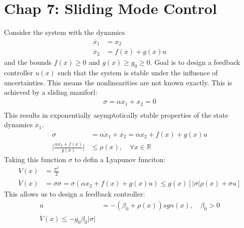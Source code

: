 \section{Chap 7: Sliding Mode Control}
Consider the system with the dynamics
\begin{align*}
    \Dot{x_1} & = x_2          \\
    \Dot{x_2} & = f(x) + g(x)u
\end{align*}
and the bounds $f(x) \geq 0$ and $g(x)\geq g_0 \geq 0$. Goal is to design a feedback controller $u(x)$ such that the system is stable under the influence of uncertainties. This means the nonlinearities are not known exactly. This is achieved by a sliding maniforl:
\begin{align*}
    \sigma = \alpha x_1 + x_2 = 0 \\
\end{align*}
This results in exponentially asymptotically stable properties of the state dynamics $\Dot{x_1}$.
\begin{align*}
    \Dot{\sigma}                                         & = \alpha \Dot{x}_1 + \Dot{x_2} = \alpha x_2 + f(x) + g(x)u \\
    \Big\lvert \frac{\alpha x_2 + f(x)}{g(x)} \Big\rvert & \leq \rho(x) , \quad \forall x \in \mathbb{R}
\end{align*}
Taking this function $\sigma$ to defin a Lyapunov funciton:
\begin{align*}
    V(x)       & = \frac{\sigma^2}{2}                                                                                           \\
    \Dot{V}(x) & = \sigma \Dot{\sigma} = \sigma (\alpha x_2 + f(x) + g(x)u) \leq g(x) [\lvert \sigma \rvert \rho(x) + \sigma u]
\end{align*}
This allows us to design a feedback controller:
\begin{align*}
    u & = -(\beta_0 + \rho(x)) sgn(x), \quad \beta_0 > 0 \\
    \Dot{V}(x) \leq -g_0\beta_0 \lvert \sigma \rvert
\end{align*}
